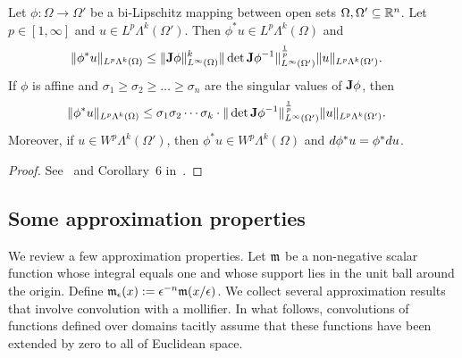 \documentclass[10pt,a4paper]{article}
\begin{document}
\begin{proposition}\label{proposition:pullbackestimate}
    Let $\phi : \Omega \rightarrow \Omega'$ be a bi-Lipschitz mapping between open sets $\Omega, \Omega' \subseteq {\mathbb R}^{n}$.
    Let $p \in [1,\infty]$ and $u \in L^{p}\Lambda^{k}(\Omega')$. 
    Then $\phi^{\ast} u \in L^{p}\Lambda^{k}(\Omega)$ and 
    \begin{align}
        \| \phi^{\ast} u \|_{L^{p}\Lambda^{k}(\Omega)}
        &\leq 
        \| {\mathbf{J}} \phi \|^{k}_{L^{\infty}(\Omega)}
        \| \det{\mathbf{J}} \phi^{-1} \|^{\frac{1}{p}}_{L^{\infty}(\Omega')}
        \| u \|_{L^{p}\Lambda^{k}(\Omega')}
        .
    \end{align}
    If $\phi$ is affine and $\sigma_1 \geq \sigma_2 \geq \dots \geq \sigma_n$ are the singular values of ${\mathbf{J}}\phi$, then 
    \begin{align}
        \| \phi^{\ast} u \|_{L^{p}\Lambda^{k}(\Omega)}
        &\leq 
        \sigma_1 \sigma_2 \cdots \sigma_k \cdot 
        \| \det{\mathbf{J}} \phi^{-1} \|^{\frac{1}{p}}_{L^{\infty}(\Omega')}
        \| u \|_{L^{p}\Lambda^{k}(\Omega')}
        .
    \end{align}
    Moreover, if $u \in W^{p}\Lambda^{k}(\Omega')$, then $\phi^{\ast} u \in W^{p}\Lambda^{k}(\Omega)$ and $d \phi^{\ast} u = \phi^{\ast} d u$. 
\end{proposition}
\begin{proof}
    See~\cite{licht2019smoothed} and Corollary~6 in~\cite{stern2013lp}.
\end{proof}




\subsection{Some approximation properties}

We review a few approximation properties. 
Let ${\mathfrak m}$ be a non-negative scalar function whose integral equals one and whose support lies in the unit ball around the origin.
Define ${\mathfrak m}_{\epsilon}(x) := \epsilon^{-n} {\mathfrak m}(x/\epsilon)$. We collect several approximation results that involve convolution with a mollifier.
In what follows, convolutions of functions defined over domains tacitly assume that these functions have been extended by zero to all of Euclidean space. 

\end{document}
